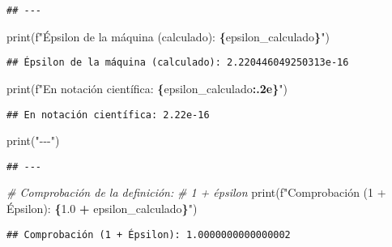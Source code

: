 \documentclass[
]{article}
\newenvironment{Shaded}{\begin{snugshade}}{\end{snugshade}}
\newcommand{\BuiltInTok}[1]{#1}
\newcommand{\CommentTok}[1]{\textcolor[rgb]{0.56,0.35,0.01}{\textit{#1}}}
\newcommand{\FloatTok}[1]{\textcolor[rgb]{0.00,0.00,0.81}{#1}}
\newcommand{\NormalTok}[1]{#1}
\newcommand{\OperatorTok}[1]{\textcolor[rgb]{0.81,0.36,0.00}{\textbf{#1}}}
\newcommand{\SpecialCharTok}[1]{\textcolor[rgb]{0.81,0.36,0.00}{\textbf{#1}}}
\newcommand{\SpecialStringTok}[1]{\textcolor[rgb]{0.31,0.60,0.02}{#1}}
\newcommand{\StringTok}[1]{\textcolor[rgb]{0.31,0.60,0.02}{#1}}
\begin{document}
\begin{verbatim}
## ---
\end{verbatim}

\begin{Shaded}
\begin{Highlighting}[]
\BuiltInTok{print}\NormalTok{(}\SpecialStringTok{f"Épsilon de la máquina (calculado): }\SpecialCharTok{\{}\NormalTok{epsilon\_calculado}\SpecialCharTok{\}}\SpecialStringTok{"}\NormalTok{)}
\end{Highlighting}
\end{Shaded}

\begin{verbatim}
## Épsilon de la máquina (calculado): 2.220446049250313e-16
\end{verbatim}

\begin{Shaded}
\begin{Highlighting}[]
\BuiltInTok{print}\NormalTok{(}\SpecialStringTok{f"En notación científica: }\SpecialCharTok{\{}\NormalTok{epsilon\_calculado}\SpecialCharTok{:.2e\}}\SpecialStringTok{"}\NormalTok{)}
\end{Highlighting}
\end{Shaded}

\begin{verbatim}
## En notación científica: 2.22e-16
\end{verbatim}

\begin{Shaded}
\begin{Highlighting}[]
\BuiltInTok{print}\NormalTok{(}\StringTok{"{-}{-}{-}"}\NormalTok{)}
\end{Highlighting}
\end{Shaded}

\begin{verbatim}
## ---
\end{verbatim}

\begin{Shaded}
\begin{Highlighting}[]
\CommentTok{\# Comprobación de la definición:}
\CommentTok{\# 1 + épsilon}
\BuiltInTok{print}\NormalTok{(}\SpecialStringTok{f"Comprobación (1 + Épsilon): }\SpecialCharTok{\{}\FloatTok{1.0} \OperatorTok{+}\NormalTok{ epsilon\_calculado}\SpecialCharTok{\}}\SpecialStringTok{"}\NormalTok{)}
\end{Highlighting}
\end{Shaded}

\begin{verbatim}
## Comprobación (1 + Épsilon): 1.0000000000000002
\end{verbatim}
\end{document}

